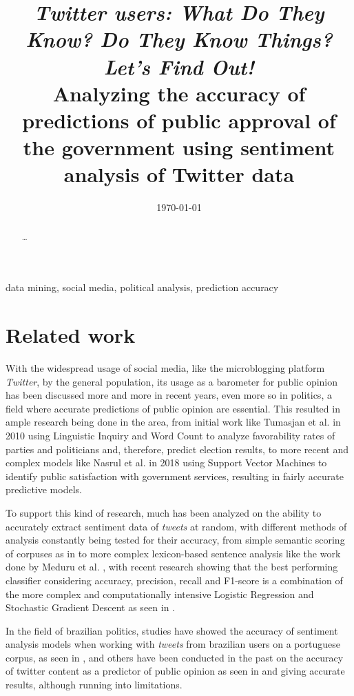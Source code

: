 \documentclass[conference]{IEEEtran}
\author{\IEEEauthorblockN{ Marco Antônio Ribeiro de Toledo \\ RA:\@ 11796419 } \IEEEauthorblockA{ B.Sc. in Computer Science\\ Instituto de Ciências Matemáticas e de Computação\\ University of São Paulo (USP)\\ mardt@usp.br \\ ORCiD: orcid.org/0000-0002-0484-8450}}
\date{\today}
\title{\emph{Twitter users: What Do They Know? Do They Know Things? Let's Find Out!} \\ {\LARGE Analyzing the accuracy of predictions of public approval of the government using sentiment analysis of Twitter data }}
\begin{document}
\maketitle
\begin{abstract}
\ldots{}
\end{abstract}

\begin{IEEEkeywords}
data mining, social media, political analysis, prediction accuracy
\end{IEEEkeywords}

\section{Related work}
\label{sec:orgd9a7c2d}
With the widespread usage of social media, like the microblogging platform \emph{Twitter}, by the general population, its usage as a barometer for public opinion has been discussed more and more in recent years, even more so in politics, a field where accurate predictions of public opinion are essential. This resulted in ample research being done in the area, from initial work like Tumasjan et al. \cite{Tumasjan2010} in 2010 using Linguistic Inquiry and Word Count to analyze favorability rates of parties and politicians and, therefore, predict election results, to more recent and complex models like Nasrul et al. \cite{Aziz2018} in 2018 using Support Vector Machines to identify public satisfaction with government services, resulting in fairly accurate predictive models.

To support this kind of research, much has been analyzed on the ability to accurately extract sentiment data of \emph{tweets} at random, with different methods of analysis constantly being tested for their accuracy, from simple semantic scoring of corpuses as in \cite{Kumar2015} to more complex lexicon-based sentence analysis like the work done by Meduru et al. \cite{opinionTwitter}, with recent research showing that the best performing classifier considering accuracy, precision, recall and F1-score is a combination of the more complex and computationally intensive Logistic Regression and Stochastic Gradient Descent as seen in \cite{Yousaf2021}.

In the field of brazilian politics, studies have showed the accuracy of sentiment analysis models when working with \emph{tweets} from brazilian users on a portuguese corpus, as seen in \cite{Weiand2017}, and others have been conducted in the past on the accuracy of twitter content as a predictor of public opinion as seen in \cite{Oliveira2017} and \cite{Oliveira2019} giving accurate results, although running into limitations.
\end{document}
